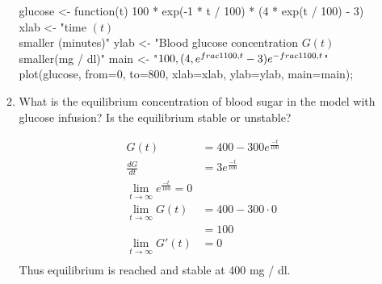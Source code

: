 \documentclass[10pt,letterpaper]{article}
\begin{document}
\begin{enumerate}
\begin{enumerate}
\begin{Solution}
\begin{Schunk}
\begin{Sinput}
 glucose <- function(t) {
   100 *  exp(-1 * t / 100) * (4 * exp(t / 100) - 3)
 }
 xlab <- "time $(t)$ {\\smaller (minutes)}"
 ylab <- "Blood glucose concentration $G(t)$ {\\smaller(mg / dl)}"
 main <- "$100 \\, {(4 \\, e^{\\frac{1}{100} \\, t} - 3)} e^{-\\frac{1}{100} \\, t}$"
 plot(glucose, from=0, to=800, xlab=xlab, ylab=ylab, main=main);
\end{Sinput}
\end{Schunk}
\end{Solution}
\bc
{}

\endpgfgraphicnamed
\ec    
    \item What is the equilibrium concentration of blood sugar in the model with glucose infusion? Is the equilibrium stable or unstable?
    \begin{Solution}
      \begin{align}
        G(t) &= 400 - 300 e^{\frac{-t}{100}} \\
        \frac{dG}{dt} &= 3 e^{\frac{-t}{100}} \\
        \lim_{t \rightarrow \infty} e^{\frac{-t}{100}} = 0 \\
        \lim_{t \rightarrow \infty} G(t) &= 400 - 300 \cdot 0 \\
          &= 100 \\
        \lim_{t \rightarrow \infty} G'(t) &= 0 \\
      \end{align}
      Thus equilibrium is reached and stable at 400 mg / dl.
    \end{Solution}
  \end{enumerate}



\end{enumerate}
\end{document}
